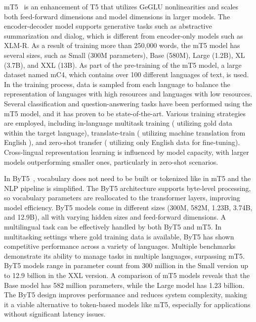 mT5~\cite{xue2020mt5} is an enhancement of T5 that utilizes GeGLU nonlinearities and scales both feed-forward dimensions and model dimensions in larger models. The encoder-decoder model supports generative tasks such as abstractive summarization and dialog, which is different from encoder-only models such as XLM-R. As a result of training more than 250,000 words, the mT5 model has several sizes, such as Small (300M parameters), Base (580M), Large (1.2B), XL (3.7B), and XXL (13B). As part of the pre-training of the mT5 model, a large dataset named mC4, which contains over 100 different languages of text, is used. In the training process, data is sampled from each language to balance the representation of languages with high resources and languages with low resources.  Several classification and question-answering tasks have been performed using the mT5 model, and it has proven to be state-of-the-art. Various training strategies are employed, including in-language multitask training ( utilizing gold data within the target language), translate-train ( utilizing machine translation from English ), and zero-shot transfer ( utilizing only English data for fine-tuning). Cross-lingual representation learning is influenced by model capacity, with larger models outperforming smaller ones, particularly in zero-shot scenarios.

In ByT5~\cite{xue2022byt5}, vocabulary does not need to be built or tokenized like in mT5 and the NLP pipeline is simplified. The ByT5 architecture supports byte-level processing, so vocabulary parameters are reallocated to the transformer layers, improving model efficiency. ByT5 models come in different sizes (300M, 582M, 1.23B, 3.74B, and 12.9B), all with varying hidden sizes and feed-forward dimensions. A multilingual task can be effectively handled by both ByT5 and mT5. In multitasking settings where gold training data is available, ByT5 has shown competitive performance across a variety of languages. Multiple benchmarks demonstrate its ability to manage tasks in multiple languages, surpassing mT5. ByT5 models range in parameter count from 300 million in the Small version up to 12.9 billion in the XXL version. A comparison of mT5 models reveals that the Base model has 582 million parameters, while the Large model has 1.23 billion. The ByT5 design improves performance and reduces system complexity, making it a viable alternative to token-based models like mT5, especially for applications without significant latency issues.


